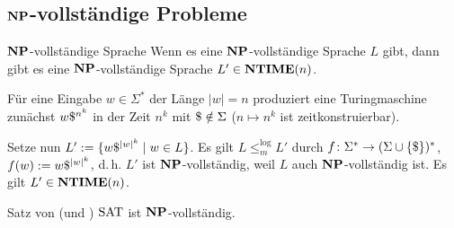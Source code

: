 \subsection{%
    \texorpdfstring{$\mathbf{NP}$}{NP}-vollständige Probleme%
}

\begin{Satz}{$\mathbf{NP}$-vollständige Sprache}
    Wenn es eine $\mathbf{NP}$-vollständige Sprache $L$ gibt,
    dann gibt es eine $\mathbf{NP}$-vollständige Sprache $L' \in \mathbf{NTIME}(n)$.
\end{Satz}

\begin{Beweis}
    Für eine Eingabe $w \in \Sigma^\ast$ der Länge $|w| = n$
    produziert eine Turingmaschine zunächst $w\$^{n^k}$ in der Zeit
    $n^k$ mit $\$ \notin \Sigma$ ($n \mapsto n^k$ ist zeitkonstruierbar).

    Setze nun $L' := \{w\$^{|w|^k} \;|\; w \in L\}$.
    Es gilt $L \le_m^{\log} L'$ durch
    $f\colon \Sigma^\ast \rightarrow (\Sigma \cup \{\$\})^\ast$,
    $f(w) := w\$^{|w|^k}$, d.\,h. $L'$ ist $\mathbf{NP}$-vollständig, weil
    $L$ auch $\mathbf{NP}$-vollständig ist.
    Es gilt $L' \in \mathbf{NTIME}(n)$.
\end{Beweis}

\linie

\begin{Satz}{Satz von  (und )}
    $\text{SAT}$ ist $\mathbf{NP}$-vollständig.
\end{Satz}


